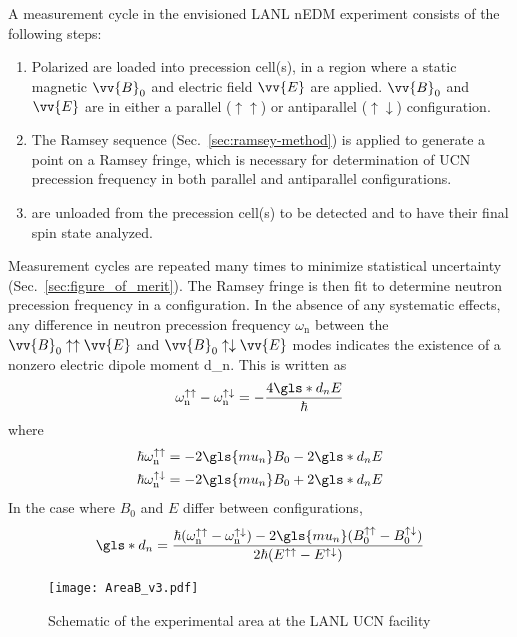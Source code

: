 A measurement cycle in the envisioned LANL nEDM experiment consists of the following steps: 
%
\begin{enumerate}
    \item Polarized \ucn are loaded into precession cell(s), in a region where a static magnetic $\vv{B}_0$ and electric field $\vv{E}$ are applied. $\vv{B}_0$ and $\vv{E}$ are in either a parallel ($\uparrow\uparrow$) or antiparallel ($\uparrow\downarrow$) configuration.
    \item The Ramsey sequence (Sec.~\ref{sec:ramsey-method}) is applied to generate a point on a Ramsey fringe, which is necessary for determination of UCN precession frequency in both parallel and antiparallel configurations.
    \item \ucn are unloaded from the precession cell(s) to be detected and to have their final spin state analyzed.
\end{enumerate}
%
Measurement cycles are repeated many times to minimize statistical uncertainty (Sec.~\ref{sec:figure_of_merit}). The Ramsey fringe is then fit to determine neutron precession frequency in a configuration. In the absence of any systematic effects, any difference in neutron precession frequency $\omega_\text{n}$ between the $\vv{B}_0\uparrow\uparrow\vv{E}$ and $\vv{B}_0\uparrow\downarrow\vv{E}$ modes indicates the existence of a nonzero electric dipole moment \gls*{d_n}. This is written as
%
\begin{gather}
    \omega_\text{n}^{\uparrow\uparrow} - \omega_\text{n}^{\uparrow\downarrow} = -\frac{4\gls*{d_n}E}{\hbar}\label{eq:delta_omega_dipole_relation}
\end{gather}
%
where
%
\begin{align}
    \hbar \omega_\text{n}^{\uparrow\uparrow} &= -2\gls{mu_n}B_0 - 2\gls*{d_n}E\\
    \hbar \omega_\text{n}^{\uparrow\downarrow} &= -2\gls{mu_n}B_0 + 2\gls*{d_n}E
\end{align}
%
In the case where $B_0$ and $E$ differ between configurations,
%
\begin{gather}
    \gls*{d_n}=\frac{\hbar(\omega_\text{n}^{\uparrow\uparrow} - \omega_\text{n}^{\uparrow\downarrow})-2\gls{mu_n}(B_0^{\uparrow\uparrow} - B_0^{\uparrow\downarrow})}{2\hbar(E^{\uparrow\uparrow} - E^{\uparrow\downarrow})}
\end{gather}
%
\begin{figure}
    \centering
    \texttt{[image: AreaB\_v3.pdf]}
    \caption{Schematic of the experimental area at the LANL UCN facility}
    \label{fig:AreaB_schematic}
\end{figure}

